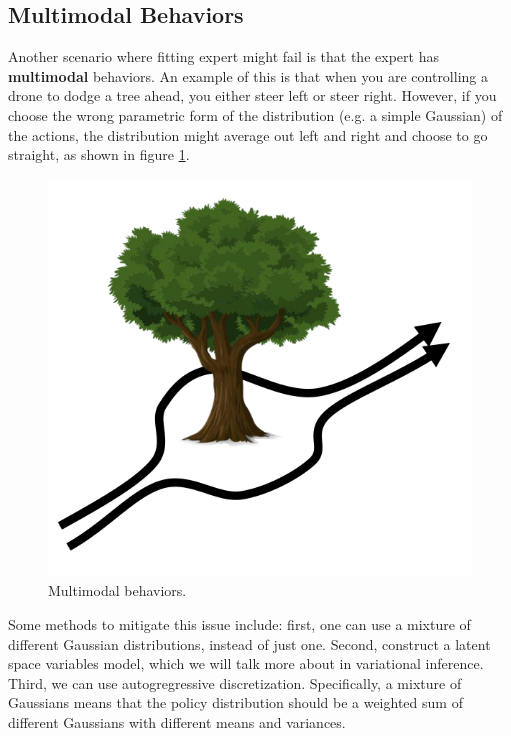 \subsection{Multimodal Behaviors}
Another scenario where fitting expert might fail is that the expert has \textbf{multimodal} behaviors. An example of this is that when you are controlling a drone to dodge a tree ahead, you either steer left or steer right. However, if you choose the wrong parametric form of the distribution (e.g. a simple Gaussian) of the actions, the distribution might average out left and right and choose to go straight, as shown in figure \ref{fig:multimodal}.
\begin{figure}
    \centering
    \includegraphics[scale=0.5]{figures/multimodal.png}
    \caption{Multimodal behaviors.}
    \label{fig:multimodal}
\end{figure}
Some methods to mitigate this issue include: first, one can use a mixture of different Gaussian distributions, instead of just one. Second, construct a latent space variables model, which we will talk more about in variational inference. Third, we can use autogregressive discretization. Specifically, a mixture of Gaussians means that the policy distribution should be a weighted sum of different Gaussians with different means and variances. 
